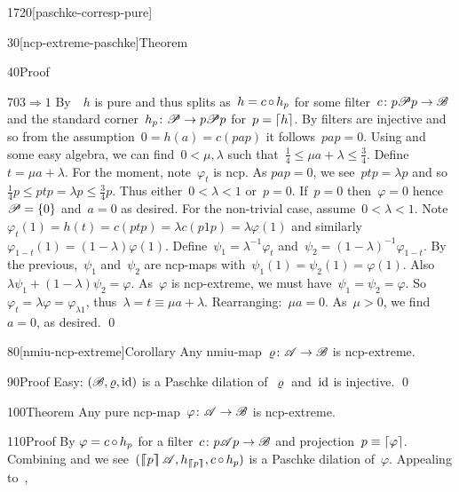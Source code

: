 \begin{parsec}{1720}[paschke-corresp-pure]
\begin{point}{30}[ncp-extreme-paschke]{Theorem}
\begin{point}{40}{Proof}
\begin{point}{70}{$3 \Rightarrow 1$}
By~~$h$ is pure
    and thus splits as~$h = c \mathop{\circ} h_p$
    for some filter~$c \colon p\mathscr{P} p \to \mathscr{B}$
    and the standard corner~$h_p\colon \mathscr{P} \to p\mathscr{P} p$
    for~$p = \left\lceil h\right\rceil$.
By  filters are injective
    and so from the assumption~$0 = h(a) = c(pap)$
    it follows~$pap = 0$.
Using  and some easy algebra,
    we can find~$0 < \mu,\lambda$
    such that~$\frac{1}{4} \leq \mu a + \lambda \leq \frac{3}{4}$.
Define~$t = \mu a + \lambda$.
For the moment, note~$\varphi_t$ is ncp.
As $pap = 0$, we see~$ptp = \lambda p$ and
so~$\frac{1}{4} p \leq  ptp = \lambda p
    \leq \frac{3}{4} p$.
Thus either~$0 < \lambda < 1$ or~$p = 0$.
If~$p = 0$ then~$\varphi=0$ hence~$\mathscr{P} = \{0\}$
    and~$a = 0$ as desired.
For the non-trivial case, assume~$0 < \lambda <1$.
Note~$\varphi_t(1) = h(t) = c(ptp) = \lambda c(p1p) = \lambda \varphi(1)$
    and similarly~$\varphi_{1-t}(1) = (1-\lambda) \varphi(1)$.
Define~$\psi_1 = \lambda^{-1} \varphi_t$
and~$\psi_2 = (1-\lambda)^{-1}\varphi_{1-t}$.
By the previous,~$\psi_1$ and~$\psi_2$ are ncp-maps
    with~$\psi_1(1)=\psi_2(1)=\varphi(1)$.
    Also~$\lambda \psi_1 + (1-\lambda) \psi_2 = \varphi$.
As~$\varphi$ is ncp-extreme,
    we must have~$\psi_1 = \psi_2 = \varphi$.
So~$\varphi_t = \lambda \varphi = \varphi_{\lambda 1}$,
    thus~$\lambda = t \equiv \mu a + \lambda$.
    Rearranging:~$\mu a = 0$.
    As~$\mu > 0$, we find~$a=0$, as desired. \qed
\end{point}
\end{point}
\end{point}
\begin{point}{80}[nmiu-ncp-extreme]{Corollary}%
Any nmiu-map~$\varrho\colon \mathscr{A} \to \mathscr{B}$ is ncp-extreme. 
\begin{point}{90}{Proof}%
Easy: $(\mathscr{B}, \varrho, \mathrm{id})$ is a Paschke dilation of~$\varrho$
and~$\mathrm{id}$ is injective.  \qed
\end{point}
\end{point}
\begin{point}{100}{Theorem}%
Any pure ncp-map~$\varphi\colon \mathscr{A} \to \mathscr{B}$ is ncp-extreme.
\begin{point}{110}{Proof}%
By  $\varphi = c \mathop{\circ} h_p$
    for a filter~$c\colon p\mathscr{A} p \to \mathscr{B}$
    and projection~$p \equiv \left\lceil\varphi\right\rceil$.
    Combining  and 
    we see~$(\cceil{p}\scrA, h_{\cceil{p}}, c\after h_p)$
    is a Paschke dilation of~$\varphi$.
Appealing to~,

\end{point}
\end{point}
\end{parsec}
